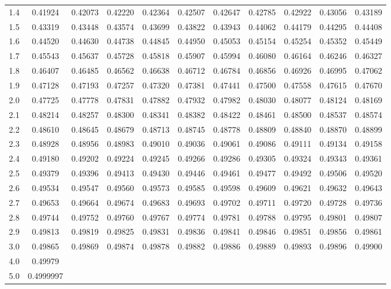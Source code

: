 \documentclass[11pt,openany]{book}\usepackage[]{graphicx}\usepackage[]{color}
\begin{document}
{\begin{table}[h]
{\begin{tabular}{lcccccccccc}
1.4 & 0.41924 & 0.42073 & 0.42220 & 0.42364 & 0.42507 & 0.42647 & 0.42785 & 0.42922 & 0.43056 & 0.43189 \\
1.5 & 0.43319 & 0.43448 & 0.43574 & 0.43699 & 0.43822 & 0.43943 & 0.44062 & 0.44179 & 0.44295 & 0.44408 \\
1.6 & 0.44520 & 0.44630 & 0.44738 & 0.44845 & 0.44950 & 0.45053 & 0.45154 & 0.45254 & 0.45352 & 0.45449 \\
1.7 & 0.45543 & 0.45637 & 0.45728 & 0.45818 & 0.45907 & 0.45994 & 0.46080 & 0.46164 & 0.46246 & 0.46327 \\
1.8 & 0.46407 & 0.46485 & 0.46562 & 0.46638 & 0.46712 & 0.46784 & 0.46856 & 0.46926 & 0.46995 & 0.47062 \\
1.9 & 0.47128 & 0.47193 & 0.47257 & 0.47320 & 0.47381 & 0.47441 & 0.47500 & 0.47558 & 0.47615 & 0.47670 \\
2.0 & 0.47725 & 0.47778 & 0.47831 & 0.47882 & 0.47932 & 0.47982 & 0.48030 & 0.48077 & 0.48124 & 0.48169 \\
2.1 & 0.48214 & 0.48257 & 0.48300 & 0.48341 & 0.48382 & 0.48422 & 0.48461 & 0.48500 & 0.48537 & 0.48574 \\
2.2 & 0.48610 & 0.48645 & 0.48679 & 0.48713 & 0.48745 & 0.48778 & 0.48809 & 0.48840 & 0.48870 & 0.48899 \\
2.3 & 0.48928 & 0.48956 & 0.48983 & 0.49010 & 0.49036 & 0.49061 & 0.49086 & 0.49111 & 0.49134 & 0.49158 \\
2.4 & 0.49180 & 0.49202 & 0.49224 & 0.49245 & 0.49266 & 0.49286 & 0.49305 & 0.49324 & 0.49343 & 0.49361 \\
2.5 & 0.49379 & 0.49396 & 0.49413 & 0.49430 & 0.49446 & 0.49461 & 0.49477 & 0.49492 & 0.49506 & 0.49520 \\
2.6 & 0.49534 & 0.49547 & 0.49560 & 0.49573 & 0.49585 & 0.49598 & 0.49609 & 0.49621 & 0.49632 & 0.49643 \\
2.7 & 0.49653 & 0.49664 & 0.49674 & 0.49683 & 0.49693 & 0.49702 & 0.49711 & 0.49720 & 0.49728 & 0.49736 \\
2.8 & 0.49744 & 0.49752 & 0.49760 & 0.49767 & 0.49774 & 0.49781 & 0.49788 & 0.49795 & 0.49801 & 0.49807 \\
2.9 & 0.49813 & 0.49819 & 0.49825 & 0.49831 & 0.49836 & 0.49841 & 0.49846 & 0.49851 & 0.49856 & 0.49861 \\
3.0 & 0.49865 & 0.49869 & 0.49874 & 0.49878 & 0.49882 & 0.49886 & 0.49889 & 0.49893 & 0.49896 & 0.49900 \\ 
4.0 & 0.49979 & \multicolumn{1}{l}{} & \multicolumn{1}{l}{} & \multicolumn{1}{l}{} & \multicolumn{1}{l}{} & \multicolumn{1}{l}{} & \multicolumn{1}{l}{} & \multicolumn{1}{l}{} & \multicolumn{1}{l}{} & \multicolumn{1}{l}{}  \\
5.0 & 0.4999997 & \multicolumn{1}{l}{} & \multicolumn{1}{l}{} & \multicolumn{1}{l}{} & \multicolumn{1}{l}{} & \multicolumn{1}{l}{} & \multicolumn{1}{l}{} & \multicolumn{1}{l}{} & \multicolumn{1}{l}{} & \multicolumn{1}{l}{} \\ \hline
\end{tabular}
}
\end{table}
\FloatBarrier




}
\end{document}
